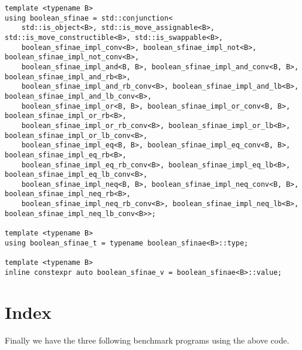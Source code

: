 \begin{verbatim}
template <typename B>
using boolean_sfinae = std::conjunction<
    std::is_object<B>, std::is_move_assignable<B>, std::is_move_constructible<B>, std::is_swappable<B>,
    boolean_sfinae_impl_conv<B>, boolean_sfinae_impl_not<B>, boolean_sfinae_impl_not_conv<B>,
    boolean_sfinae_impl_and<B, B>, boolean_sfinae_impl_and_conv<B, B>, boolean_sfinae_impl_and_rb<B>,
    boolean_sfinae_impl_and_rb_conv<B>, boolean_sfinae_impl_and_lb<B>, boolean_sfinae_impl_and_lb_conv<B>,
    boolean_sfinae_impl_or<B, B>, boolean_sfinae_impl_or_conv<B, B>, boolean_sfinae_impl_or_rb<B>,
    boolean_sfinae_impl_or_rb_conv<B>, boolean_sfinae_impl_or_lb<B>, boolean_sfinae_impl_or_lb_conv<B>,
    boolean_sfinae_impl_eq<B, B>, boolean_sfinae_impl_eq_conv<B, B>, boolean_sfinae_impl_eq_rb<B>,
    boolean_sfinae_impl_eq_rb_conv<B>, boolean_sfinae_impl_eq_lb<B>, boolean_sfinae_impl_eq_lb_conv<B>,
    boolean_sfinae_impl_neq<B, B>, boolean_sfinae_impl_neq_conv<B, B>, boolean_sfinae_impl_neq_rb<B>,
    boolean_sfinae_impl_neq_rb_conv<B>, boolean_sfinae_impl_neq_lb<B>, boolean_sfinae_impl_neq_lb_conv<B>>;

template <typename B>
using boolean_sfinae_t = typename boolean_sfinae<B>::type;

template <typename B>
inline constexpr auto boolean_sfinae_v = boolean_sfinae<B>::value;
\end{verbatim}

\section{Index}

Finally we have the three following benchmark programs using the above code.


